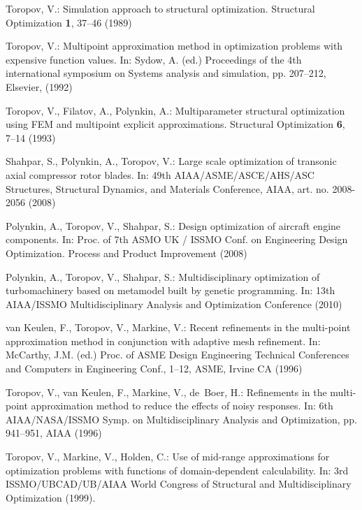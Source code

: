 \documentclass[runningheads,a4paper]{llncs}
\begin{document}
\begin{thebibliography}{10}

Toropov, V.:
\newblock Simulation approach to structural optimization.
\newblock Structural Optimization \textbf{1}, 37--46 (1989)

Toropov, V.:
\newblock Multipoint approximation method in optimization problems with expensive function values.
\newblock In: Sydow, A. (ed.) Proceedings of the 4th international symposium on Systems analysis and simulation, 
pp. 207--212, Elsevier,  (1992)

Toropov, V., Filatov, A., Polynkin, A.:
\newblock Multiparameter structural optimization using FEM and multipoint explicit approximations.
\newblock Structural Optimization \textbf{6}, 7--14 (1993)

Shahpar, S., Polynkin, A., Toropov, V.:
\newblock Large scale optimization of transonic axial compressor rotor blades.
\newblock In:  49th AIAA/ASME/ASCE/AHS/ASC Structures, Structural Dynamics, and Materials Conference, AIAA, art. no. 2008-2056 (2008)

Polynkin, A., Toropov, V., Shahpar, S.:
\newblock Design optimization of aircraft engine components.
\newblock In: Proc. of 7th ASMO UK / ISSMO Conf. on Engineering Design Optimization. Process and Product Improvement (2008)

Polynkin, A., Toropov, V., Shahpar, S.:
\newblock Multidisciplinary optimization of turbomachinery based on metamodel built by genetic programming.
\newblock In: 13th AIAA/ISSMO Multidisciplinary Analysis and Optimization Conference (2010)

van Keulen, F., Toropov, V., Markine, V.:
\newblock Recent refinements in the multi-point approximation method in conjunction with adaptive mesh refinement.
\newblock In: McCarthy, J.M. (ed.) Proc. of ASME Design Engineering Technical Conferences and Computers
  in Engineering Conf., 1--12, ASME, Irvine CA (1996)

Toropov, V., van Keulen, F., Markine, V., de~Boer, H.:
\newblock Refinements in the multi-point approximation method to reduce the effects of noisy responses.
\newblock In: 6th AIAA/NASA/ISSMO Symp. on Multidisciplinary Analysis and Optimization,  pp. 941--951, AIAA (1996)

Toropov, V., Markine, V., Holden, C.:
\newblock Use of mid-range approximations for optimization problems with functions of domain-dependent calculability.
\newblock In: 3rd ISSMO/UBCAD/UB/AIAA World Congress of Structural and Multidisciplinary Optimization (1999).


\end{thebibliography}
\end{document}

